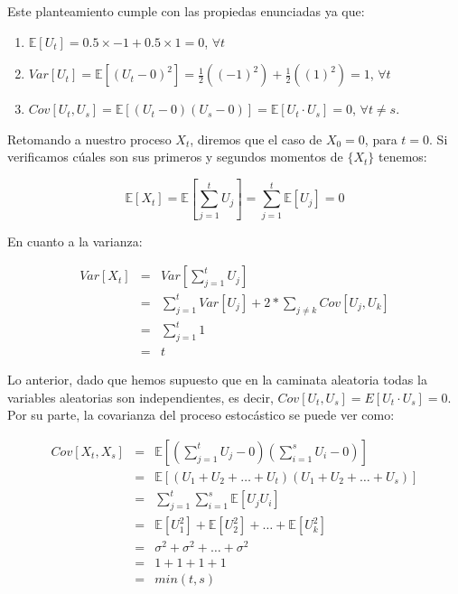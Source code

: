 \documentclass[
  a4paper,
]{article}
\begin{document}
Este planteamiento cumple con las propiedas enunciadas ya que:

\begin{enumerate}
\def\labelenumi{\arabic{enumi}.}
\item
  \(\mathbb{E}[U_t] = 0.5 \times -1 + 0.5 \times 1 = 0\), \(\forall t\)
\item
  \(Var[U_t] = \mathbb{E}[(U_t - 0)^2] = \frac{1}{2}((-1)^2) + \frac{1}{2}((1)^2) = 1\),
  \(\forall t\)
\item
  \(Cov[U_t,U_s] = \mathbb{E}[(U_t - 0)(U_s - 0)] = \mathbb{E}[U_t \cdot U_s] = 0\),
  \(\forall t \neq s\).
\end{enumerate}

Retomando a nuestro proceso \(X_t\), diremos que el caso de \(X_0 = 0\),
para \(t = 0\). Si verificamos cúales son sus primeros y segundos
momentos de \(\{X_t\}\) tenemos:

\[
\mathbb{E}[X_t] = \mathbb{E}\left[ \sum^t_{j=1} U_j \right] = \sum^t_{j=1} \mathbb{E}[U_j] = 0
\]

En cuanto a la varianza:

\begin{eqnarray}
  Var[X_t] & = & Var \left[ \sum^t_{j=1} U_j \right] \nonumber \\
  & = & \sum^t_{j=1} Var[U_j] + 2 * \sum_{j \neq k} Cov[U_j,U_k] \nonumber \\
  & = & \sum^t_{j=1} 1 \nonumber \\
  & = & t    
\end{eqnarray}

Lo anterior, dado que hemos supuesto que en la caminata aleatoria todas
la variables aleatorias son independientes, es decir,
\(Cov[U_t,U_s] = E[U_t \cdot U_s] = 0\). Por su parte, la covarianza del
proceso estocástico se puede ver como:

\begin{eqnarray*}
  Cov[X_t,X_s] & = & \mathbb{E} \left[ \left( \sum^t_{j=1} U_j - 0 \right) \left( \sum^s_{i=1} U_i - 0 \right) \right] \\
  & = & \mathbb{E}[(U_1 + U_2 + \ldots + U_t)(U_1 + U_2 + \ldots + U_s)] \\
  & = & \sum^t_{j=1} \sum^s_{i=1} \mathbb{E}[U_j U_i] \\
  & = & \mathbb{E}[U^2_1] + \mathbb{E}[U^2_2] + \ldots + \mathbb{E}[U^2_k] \\
  & = & \sigma^2 + \sigma^2 + \ldots + \sigma^2 \\
  & = & 1 + 1 + 1 + 1 \\
  & = & min(t,s)
\end{eqnarray*}
\end{document}
